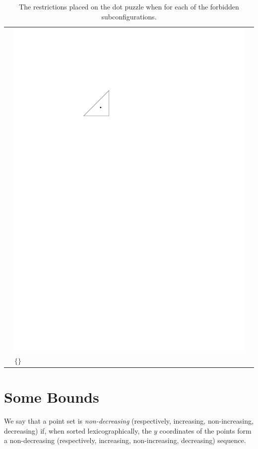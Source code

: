 \documentclass{patmorin}
\begin{document}
\begin{table}
\begin{center}
\begin{tabular}{m{1ex}|>{\centering\arraybackslash}m{}|>{\centering\arraybackslash}m{}}
         & \includegraphics[scale=.8]{figs/killersb-8} \break%
           $\{\}$ \\
\end{tabular}
\end{center}
   \caption{The restrictions placed on the dot puzzle when for each of 
     the forbidden subconfigurations.}
\end{table}
\section{Some Bounds}

We say that a point set is \emph{non-decreasing} (respectively, increasing, non-increasing, decreasing) if, when sorted lexicographically, the $y$ coordinates of the points form a non-decreasing (respectively, increasing, non-increasing, decreasing) sequence.
\end{document}
